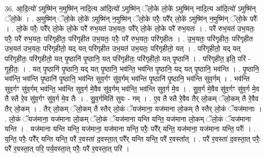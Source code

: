 \documentclass[17pt]{extarticle}
\begin{document}
36. आ॒दि॒त्यो॑ ऽमुष्मि॑न् न॒मुष्मि॑न् नादि॒त्य आ॑दि॒त्यो॑ ऽमुष्मि॑न् ॅलो॒के लो॒के॑ ऽमुष्मि॑न् नादि॒त्य आ॑दि॒त्यो॑ ऽमुष्मि॑न् ॅलो॒के । . अ॒मुष्मि॑न् ॅलो॒के लो॒के॑ ऽमुष्मि॑न् न॒मुष्मि॑न् ॅलो॒के परैः॒ परै᳚र् लो॒के॑ ऽमुष्मि॑न् न॒मुष्मि॑न् ॅलो॒के परैः᳚ । . लो॒के परैः॒ परै᳚र् लो॒के लो॒के परै॑ रुभ॒यत॑ उभ॒यतः॒ परै᳚र् लो॒के लो॒के परै॑ रुभ॒यतः॑ । . परै॑ रुभ॒यत॑ उभ॒यतः॒ परैः॒ परै॑ रुभ॒यतः॒ परि॑गृहीतः॒ परि॑गृहीत उभ॒यतः॒ परैः॒ परै॑ रुभ॒यतः॒ परि॑गृहीतः । . उ॒भ॒यतः॒ परि॑गृहीतः॒ परि॑गृहीत उभ॒यत॑ उभ॒यतः॒ परि॑गृहीतो॒ यद् यत् परि॑गृहीत उभ॒यत॑ उभ॒यतः॒ परि॑गृहीतो॒ यत् । . परि॑गृहीतो॒ यद् यत् परि॑गृहीतः॒ परि॑गृहीतो॒ यत् पृ॒ष्ठानि॑ पृ॒ष्ठानि॒ यत् परि॑गृहीतः॒ परि॑गृहीतो॒ यत् पृ॒ष्ठानि॑ । . परि॑गृहीत॒ इति॒ परि॑ - गृ॒ही॒तः॒ । . यत् पृ॒ष्ठानि॑ पृ॒ष्ठानि॒ यद् यत् पृ॒ष्ठानि॒ भव॑न्ति॒ भव॑न्ति पृ॒ष्ठानि॒ यद् यत् पृ॒ष्ठानि॒ भव॑न्ति । . पृ॒ष्ठानि॒ भव॑न्ति॒ भव॑न्ति पृ॒ष्ठानि॑ पृ॒ष्ठानि॒ भव॑न्ति सुव॒र्गꣳ सु॑व॒र्गम् भव॑न्ति पृ॒ष्ठानि॑ पृ॒ष्ठानि॒ भव॑न्ति सुव॒र्गम् । . भव॑न्ति सुव॒र्गꣳ सु॑व॒र्गम् भव॑न्ति॒ भव॑न्ति सुव॒र्ग मे॒वैव सु॑व॒र्गम् भव॑न्ति॒ भव॑न्ति सुव॒र्ग मे॒व । . सु॒व॒र्ग मे॒वैव सु॑व॒र्गꣳ सु॑व॒र्ग मे॒व तै स्तै रे॒व सु॑व॒र्गꣳ सु॑व॒र्ग मे॒व तैः । . सु॒व॒र्गमिति॑ सुवः - गम् । . ए॒व तै स्तै रे॒वैव तैर् लो॒कम् ॅलो॒कम् तै रे॒वैव तैर् लो॒कम् । . तैर् लो॒कम् ॅलो॒कम् तै स्तैर् लो॒कं ॅयज॑माना॒ यज॑माना लो॒कम् तै स्तैर् लो॒कं ॅयज॑मानाः । . लो॒कं ॅयज॑माना॒ यज॑माना लो॒कम् ॅलो॒कं ॅयज॑माना यन्ति यन्ति॒ यज॑माना लो॒कम् ॅलो॒कं ॅयज॑माना यन्ति । . यज॑माना यन्ति यन्ति॒ यज॑माना॒ यज॑माना यन्ति॒ परैः॒ परै᳚र् यन्ति॒ यज॑माना॒ यज॑माना यन्ति॒ परैः᳚ । . य॒न्ति॒ परैः॒ परै᳚र् यन्ति यन्ति॒ परै॑ र॒वस्ता॑ द॒वस्ता॒त् परै᳚र् यन्ति यन्ति॒ परै॑ र॒वस्ता᳚त् । . परै॑ र॒वस्ता॑ द॒वस्ता॒त् परैः॒ परै॑ र॒वस्ता॒त् परि॒ पर्य॒वस्ता॒त् परैः॒ परै॑ र॒वस्ता॒त् परि॑ । \newline
\end{document}
